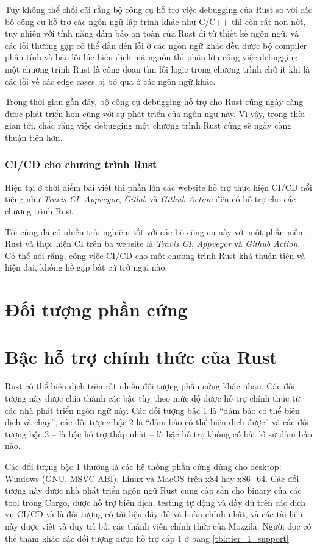 Tuy không thể chối cãi rằng bộ công cụ hỗ trợ việc debugging của Rust so với các bộ công cụ hỗ trợ các ngôn ngữ lập trình khác như C/C++ thì còn rất non nớt, tuy nhiên với tính năng đảm bảo an toàn của Rust đi từ thiết kế ngôn ngữ, và các lỗi thường gặp có thể dẫn đến lỗi ở các ngôn ngữ khác đều được bộ compiler phân tính và báo lỗi lúc biên dịch mã nguồn thì phần lớn công việc debugging một chương trình Rust là công đoạn tìm lỗi logic trong chương trình chứ ít khi là các lỗi về các edge cases bị bỏ qua ở các ngôn ngữ khác.

Trong thời gian gần đây, bộ công cụ debugging hỗ trợ cho Rust cũng ngày càng được phát triển hơn cùng với sự phát triển của ngôn ngữ này.
Vì vậy, trong thời gian tới, chắc rằng việc debugging một chương trình Rust cũng sẽ ngày càng thuận tiện hơn.
\subsubsection{CI/CD cho chương trình Rust}
Hiện tại ở thời điểm bài viết thì phần lớn các website hỗ trợ thực hiện CI/CD nổi tiếng như \emph{Travis CI}, \emph{Appveyor}, \emph{Gitlab} và \emph{Github Action} đều có hỗ trợ cho các chương trình Rust.

Tôi cũng đã có nhiều trải nghiệm tốt với các bộ công cụ này với một phần mềm Rust và thực hiện CI trên ba website là \emph{Travis CI}, \emph{Appveyor} và \emph{Github Action}. %
Có thể nói rằng, công việc CI/CD cho một chương trình Rust khá thuận tiện và hiện đại, không hề gặp bất cứ trở ngại nào.

\section{Đối tượng phần cứng}
\section{Bậc hỗ trợ chính thức của Rust}
Rust có thể biên dịch trên rất nhiều đối tượng phần cứng khác nhau.
Các đối tượng này được chia thành các bậc tùy theo mức độ được hỗ trợ chính thức từ các nhà phát triển ngôn ngữ này.
Các đối tượng bậc 1 là ``đảm bảo có thể biên dịch và chạy'', các đối tượng bậc 2 là ``đảm bảo có thể biên dịch được'' và các đối tượng bậc 3 -- là bậc hỗ trợ thấp nhất -- là bậc hỗ trợ không có bất kì sự đảm bảo nào.

Các đối tượng bậc 1 thường là các hệ thống phần cứng dùng cho desktop: Windows (GNU, MSVC ABI), Linux và MacOS trên x84 hay x86\_64.
Các đối tượng này được nhà phát triển ngôn ngữ Rust cung cấp sẵn cho binary của các tool trong Cargo, được hỗ trợ biên dịch, testing tự động và đầy đủ trên các dịch vụ CI/CD và là đối tượng có tài liệu đầy đủ và hoàn chỉnh nhất, và các tài liệu này được viết và duy trì bởi các thành viên chính thức của Mozzila.
Người đọc có thể tham khảo các đối tượng được hỗ trợ cấp 1 ở bảng \ref{tbl:tier_1_support}

